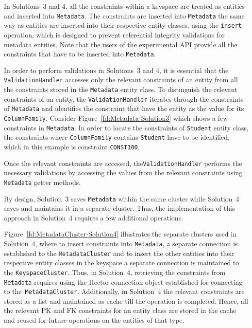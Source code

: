 In Solutions~3 and 4,   all the constraints within a keyspace are treated as
entities and inserted into  \texttt{Metadata}.  The constraints are inserted into
\texttt{Metadata}  the same way as entities are inserted into their respective
entity classes,  using the \texttt{insert} operation,  which is designed to
prevent referential integrity validations for metadata entities.  Note that the
users of the experimental \ac{API} provide all the constraints that have to be
inserted into \texttt{Metadata}. 

In order to perform validations in Solutions~3 and 4,  it is essential that the
\texttt{ValidationHandler}  accesses only the relevant constraints of an entity
from all the constraints stored in the \texttt{Metadata} entity class.  To
distinguish the relevant constraints of an entity,  the
\texttt{ValidationHandler} iterates through the constraints of \texttt{Metadata}
and identifies the constraint that have the entity as the value for its
\texttt{ColumnFamily}. 
Consider Figure~\ref{fd:Metadata-Solution3} which shows a few constraints in
\texttt{Metadata}.  In order to locate the constraints of \texttt{Student} entity
class,  the constraints where \texttt{ColumnFamily} contains 
\texttt{Student} have to be identified,  which in this example is constraint \texttt{CONST100}. 


Once the relevant constraints are
accessed,   the\texttt{ValidationHandler} performs the necessary validations by
accessing the values from the relevant constraints using \texttt{Metadata}
getter methods.  

By design,  Solution~3 saves \texttt{Metadata} within the same cluster while
Solution~4 saves and maintains it in a separate cluster.  Thus,  the
implementation of this approach in Solution~4 requires a few additional
operations.  

Figure~\ref{fd:MetadataCluster-Solution4} illustrates the separate clusters used
in Solution~4,  where to insert constraints into \texttt{Metadata},  a separate
connection is established to the \texttt{MetadataCluster} and to insert the
other entities into their respective entity classes in the keyspace a separate
connection is maintained to the \texttt{KeyspaceCluster}.  Thus,  in Solution~4, 
retrieving the constraints from \texttt{Metadata} requires using the Hector
connection object established for connecting to the~\texttt{MetadataCluster}. 
Additionally,  in Solution~4 the relevant constraints are stored as a list and
maintained as cache till the operation is completed. 
Hence,  all the relevant \ac{PK} and \ac{FK} constraints for an entity class are
stored in the cache and reused for future operations on the entities of that
type. 

